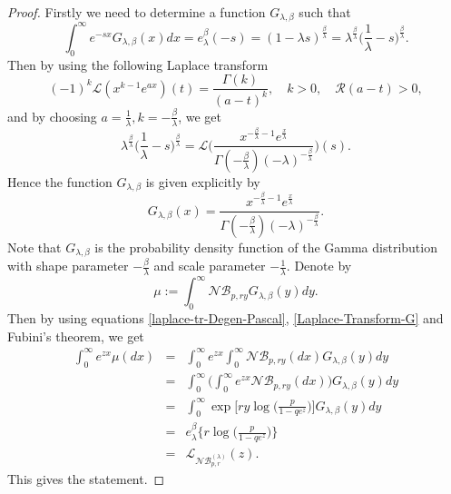 \documentclass{birkjour}
\theoremstyle{definition}
\theoremstyle{remark}
\numberwithin{equation}{section}
\begin{document}
\begin{proof}
Firstly we need to determine a function $G_{\lambda, \beta}$ such
that
\begin{equation}\label{Laplace-Transform-G}
\displaystyle{\int_{0}^{\infty} e^{-sx} G_{\lambda, \beta}(x)dx=
e^{\beta}_{\lambda} (-s)=(1-\lambda
s)^{\frac{\beta}{\lambda}}=\lambda^{\frac{\beta}{\lambda}}\Big(\frac{1}{\lambda}-s\Big)^{\frac{\beta}{\lambda}}}.
\end{equation}
Then by using the following Laplace transform
\begin{equation*}
(-1)^k\mathcal{L}(x^{k-1}e^{ax})(t)=\frac{\Gamma (k)}{(a-t)^{k}},
\quad k >0, \quad \mathcal{R}(a-t)> 0,
\end{equation*}
and by choosing $\displaystyle{a=\frac{1}{\lambda},
k=-\frac{\beta}{\lambda}}$, we get
\begin{equation*}
\lambda^{\frac{\beta}{\lambda}}\Big(\frac{1}{\lambda}-s
\Big)^{\frac{\beta}{\lambda}}=\mathcal{L}\Big(
\frac{x^{-\frac{\beta}{\lambda}-1}e^{\frac{x}{\lambda}}}{\Gamma(-\frac{\beta}{\lambda})
(-\lambda)^{-\frac{\beta}{\lambda}}}\Big)(s).
\end{equation*}
Hence the function $G_{\lambda, \beta}$ is given explicitly by
\begin{equation}\label{G-func}
G_{\lambda, \beta}(x) =
\frac{x^{-\frac{\beta}{\lambda}-1}e^{\frac{x}{\lambda}}}{\Gamma(-\frac{\beta}{\lambda})
(-\lambda)^{-\frac{\beta}{\lambda}}}.
\end{equation}
Note that $G_{\lambda, \beta}$ is the probability density function
of the Gamma distribution with shape parameter
$-\frac{\beta}{\lambda}$ and scale parameter $-\frac{1}{\lambda}$.
Denote by
$$\mu:=\displaystyle{\int^{\infty}_{0}\mathcal{N}\mathcal{B}_{p, ry}G_{\lambda, \beta}(y)dy}.$$
Then by using equations \eqref{laplace-tr-Degen-Pascal},
\eqref{Laplace-Transform-G} and Fubini's theorem, we get
$$\begin{array}{lll}
\displaystyle{\int^{\infty}_{0}e^{zx}\mu(dx)}&=&
\displaystyle{\int^{\infty}_{0}e^{zx}\int^{\infty}_{0}\mathcal{N}\mathcal{B}_{p, ry}(dx)G_{\lambda, \beta}(y)dy}\\
&=&\displaystyle{\int^{\infty}_{0}\Big(\int^{\infty}_{0}e^{zx}\mathcal{N}\mathcal{B}_{p, ry}(dx)\Big)G_{\lambda, \beta}(y)dy}\\
&=&\displaystyle{\int^{\infty}_{0}\exp\Big[ry\log\big(\frac{p}{1-qe^{z}}\big)\Big]G_{\lambda, \beta}(y)dy}\\
&=&\displaystyle{e^{\beta}_{\lambda}\Big\{r\log\Big(\frac{p}{1-qe^{z}}\Big)\Big\}}\\
&=&\mathcal{L}_{\mathcal{N}\mathcal{B}^{(\lambda)}_{p, r}}(z).
\end{array}$$
This gives the statement.
\end{proof}
\end{document}
